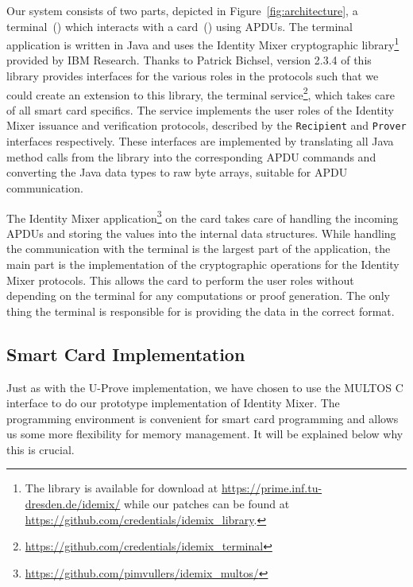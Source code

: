 Our system consists of two parts, depicted in Figure~\ref{fig:architecture}, a
terminal~() which interacts with a
card~() using APDUs. The terminal application is
written in Java and uses the Identity Mixer cryptographic library\footnote{The
library is available for download at \url{https://prime.inf.tu-dresden.de/idemix/}
while our patches can be found at \url{https://github.com/credentials/idemix_library}.}
provided by IBM Research. Thanks to Patrick Bichsel, version 2.3.4 of this
library provides interfaces for the various roles in the protocols such that we
could create an extension to this library, the terminal
service\footnote{\url{https://github.com/credentials/idemix_terminal}}, which
takes care of all smart card specifics. The service implements the user roles of
the Identity Mixer issuance and verification protocols, described by the
\texttt{Recipient} and \texttt{Prover} interfaces respectively. These
interfaces are implemented by translating all Java method calls from the
library into the corresponding APDU commands and converting the Java data types
to raw byte arrays, suitable for APDU communication.

The Identity Mixer application\footnote{\url{https://github.com/pimvullers/idemix_multos/}}
on the card takes care of handling the incoming APDUs and storing the values
into the internal data structures. While handling the communication with the
terminal is the largest part of the application, the main part is the
implementation of the cryptographic operations for the Identity Mixer protocols.
This allows the card to perform the user roles without depending on the terminal
for any computations or proof generation. The only thing the terminal is
responsible for is providing the data in the correct format.

\subsection{Smart Card Implementation}

Just as with the U-Prove implementation, we have chosen to use the MULTOS C
interface to do our prototype implementation of Identity Mixer. The programming
environment is convenient for smart card programming and allows us some more
flexibility for memory management. It will be explained below why this is
crucial.

